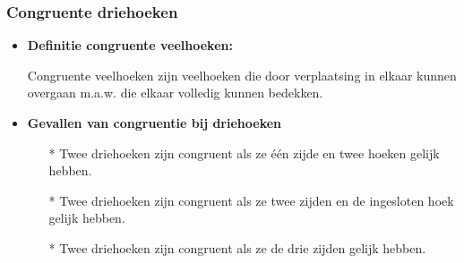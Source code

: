 \subsubsection{Congruente driehoeken} \label{congruente_driehoeken}
\hypertarget{congruente_driehoeken}{}
		\begin{itemize}%
		\item \hypertarget{congruente_veelhoeken}{{\bf Definitie congruente veelhoeken:}} \label{congruente_veelhoeken} Congruente veelhoeken 		zijn veelhoeken die door verplaatsing in elkaar kunnen overgaan m.a.w. die elkaar 		volledig kunnen bedekken.
		\item {\bf Gevallen van congruentie bij driehoeken}
			\begin{itemize}%
			\item[*] Twee driehoeken zijn congruent als ze \'e\'en zijde en twee hoeken 			gelijk hebben.
			\item[*] Twee driehoeken zijn congruent als ze twee zijden en de ingesloten 			hoek gelijk hebben.
			\item[*] Twee driehoeken zijn congruent als ze de drie zijden gelijk hebben.
			\end{itemize}%
		\end{itemize}%

